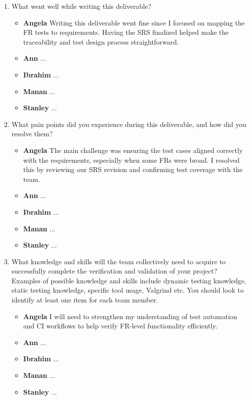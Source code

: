 \documentclass[12pt, titlepage]{article}
\begin{document}
\begin{enumerate}
  \item What went well while writing this deliverable? 
  \begin{itemize}
      \item \textbf{Angela} Writing this deliverable went fine since I focused on mapping the FR tests to requirements. Having the SRS finalized helped make the traceability and test design process straightforward.  
      \item \textbf{Ann} ...
      \item \textbf{Ibrahim} ...
      \item \textbf{Manan} ...
      \item \textbf{Stanley} ...
    \end{itemize}
  \item What pain points did you experience during this deliverable, and how
    did you resolve them?
    \begin{itemize}
      \item \textbf{Angela} The main challenge was ensuring the test cases aligned correctly with the requirements, especially when some FRs were broad. I resolved this by reviewing our SRS revision and confirming test coverage with the team.
      \item \textbf{Ann} ...
      \item \textbf{Ibrahim} ...
      \item \textbf{Manan} ...
      \item \textbf{Stanley} ...
    \end{itemize}
  \item What knowledge and skills will the team collectively need to acquire to
  successfully complete the verification and validation of your project?
  Examples of possible knowledge and skills include dynamic testing knowledge,
  static testing knowledge, specific tool usage, Valgrind etc.  You should look to
  identify at least one item for each team member.
  \begin{itemize}
      \item \textbf{Angela} I will need to strengthen my understanding of test automation and CI workflows to help verify FR-level functionality efficiently.
      \item \textbf{Ann} ...
      \item \textbf{Ibrahim} ...
      \item \textbf{Manan} ...
      \item \textbf{Stanley} ...
    \end{itemize}

\end{enumerate}
\end{document}
